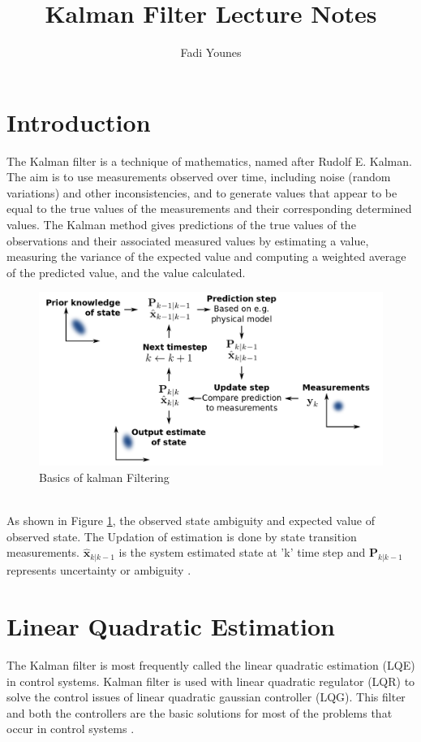 \documentclass[12pt,a4paper]{article}
\begin{document}
\title{Kalman Filter Lecture Notes}
\author {Fadi Younes}
\maketitle
\newpage
\section*{Introduction}

The Kalman filter is a technique of mathematics, named after Rudolf E. Kalman. The aim is to use measurements observed over time, including noise (random variations) and other inconsistencies, and to generate values that appear to be equal to the true values of the measurements and their corresponding determined values. The Kalman method gives predictions of the true values of the observations and their associated measured values by estimating a value, measuring the variance of the expected value and computing a weighted average of the predicted value, and the value calculated\cite{zarchan2013fundamentals}.\\
\begin{figure}[h]
  \centering
 \includegraphics[width=3.4 in]{k.PNG}
  \caption{Basics of kalman Filtering}\label{1}
\end{figure}
\\As shown in Figure \ref{1}, the observed state ambiguity and expected value of observed state. The Updation of estimation is done by state transition measurements. $\hat{\mathbf{x}}_{k | k-1}$ is the system estimated state at 'k' time step and $\mathbf{P}_{k |k-1}$ represents uncertainty or ambiguity \cite{zarchan2013fundamentals}\cite{wolpert2000perception}.
\section*{Linear Quadratic Estimation}

The Kalman filter is most frequently called the linear quadratic estimation (LQE) in control systems. Kalman filter is used with linear quadratic regulator (LQR) to solve the control issues of linear quadratic gaussian controller (LQG). This filter and both the controllers are the basic solutions for most of the problems that occur in control systems \cite{klumb2006division}.\\
\end{document}
